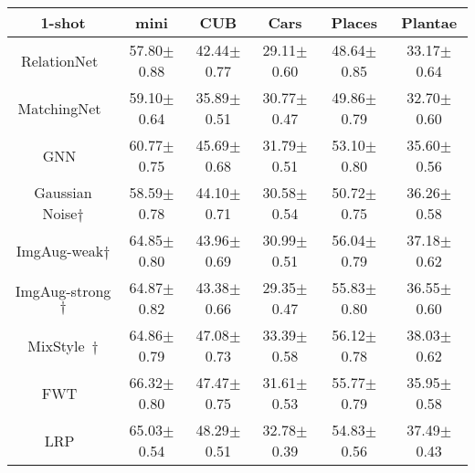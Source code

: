 \documentclass{article}
\newcommand{\mypm}{\scriptsize$\pm$}
\begin{document}
	
	\begin{table*}[!t] \footnotesize
		\begin{center}
			\begin{tabular} { c c c c c c}
				\toprule
				\textbf{1-shot} & \textbf{mini} & \textbf{CUB} & \textbf{Cars} & \textbf{Places} & \textbf{Plantae} \\
				\hline       
				


				RelationNet~\cite{sung2018learning} & 57.80\mypm0.88 & 42.44\mypm0.77 & 29.11\mypm0.60 & 48.64\mypm0.85 & 33.17\mypm0.64  \\
				
				MatchingNet~\cite{vinyals2016matching} & 59.10\mypm0.64 & 35.89\mypm0.51 & 30.77\mypm0.47 & 49.86\mypm0.79 & 32.70\mypm0.60  \\
				
				GNN~\cite{garcia2017few} &  60.77\mypm0.75 & 45.69\mypm0.68 & 31.79\mypm0.51 & 53.10\mypm0.80 & 35.60\mypm0.56 \\
				\hline
				
				
Gaussian Noise$\dagger$  & 58.59\mypm0.78	& 44.10\mypm0.71	& 30.58\mypm0.54	& 50.72\mypm0.75	& 36.26\mypm0.58 \\
				
				ImgAug-weak$\dagger$     & 64.85\mypm0.80 & 43.96\mypm0.69 & 30.99\mypm0.51 & 56.04\mypm0.79 & 37.18\mypm0.62\\
				
				ImgAug-strong$\dagger$  & 64.87\mypm0.82 & 43.38\mypm0.66 & 29.35\mypm0.47 & 55.83\mypm0.80 & 36.55\mypm0.60\\
				




				MixStyle~\cite{zhou2021domain}$\dagger$   & 64.86\mypm0.79 & 47.08\mypm0.73 & 33.39\mypm0.58 & 56.12\mypm0.78 & 38.03\mypm0.62 \\
				
				
				\hline
				
				






				
FWT~\cite{tseng2020cross}  & 66.32\mypm0.80 & 47.47\mypm0.75 & 31.61\mypm0.53 & 55.77\mypm0.79 & 35.95\mypm0.58 \\
				
				LRP~\cite{sun2021explanation}  & 65.03\mypm0.54 & 48.29\mypm0.51 & 32.78\mypm0.39 & 54.83\mypm0.56  & 37.49\mypm0.43 \\
				

\end{tabular}
\end{center}
\end{table*}
\end{document}
